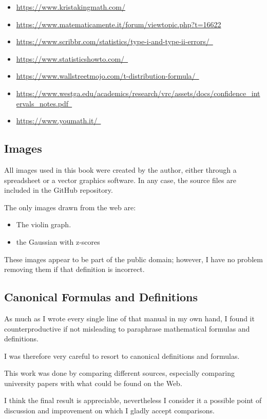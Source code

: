 \documentclass{article}
\begin{document}
\begin{sloppypar}
\begin{itemize}
    \item \url{https://www.kristakingmath.com/}
    \item \url{https://www.matematicamente.it/forum/viewtopic.php?t=16622}
    \item \url{https://www.scribbr.com/statistics/type-i-and-type-ii-errors/ }
    \item \url{https://www.statisticshowto.com/ }
    \item \url{https://www.wallstreetmojo.com/t-distribution-formula/ }
    \item \url{https://www.westga.edu/academics/research/vrc/assets/docs/confidence_intervals_notes.pdf }
    \item \url{https://www.youmath.it/ }
\end{itemize}
\end{sloppypar}

\subsection{Images}
All images used in this book were created by the author, either through a spreadsheet or a vector graphics software. 
In any case, the source files are included in the GitHub repository.

The only images drawn from the web are:
\begin{itemize}
    \item The violin graph.
    \item the Gaussian with z-scores
\end{itemize}

These images appear to be part of the public domain; however, I have no problem removing them if that definition is incorrect. 

\subsection{Canonical Formulas and Definitions}
As much as I wrote every single line of that manual in my own hand, I found it counterproductive if not misleading to paraphrase mathematical formulas and definitions. 

I was therefore very careful to resort to canonical definitions and formulas. 

This work was done by comparing different sources, especially comparing university papers with what could be found on the Web.

I think the final result is appreciable, nevertheless I consider it a possible point of discussion and improvement on which I gladly accept comparisons.
\end{document}
